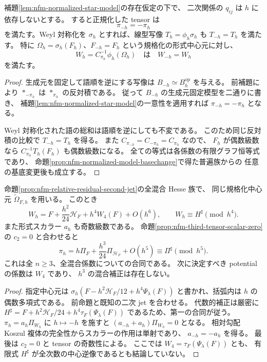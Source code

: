 \begin{proposition}[生成元固定模型の偶奇性]
\label{prop:nfm-normalized-parity}
補題\ref{lem:nfm-normalized-star-model}の存在仮定の下で、
二次関係の $q_{ij}$ は $h$ に依存しないとする。
すると正規化した tensor は
\[
 \pi_{-h}=-\pi_h
\]
を満たす。Weyl 対称化を $\sigma_h$ とすれば、線型写像
$T_h=\phi_h\sigma_h$ も $T_{-h}=T_h$ を満たす。
特に $\Omega_h=\sigma_h(F_h)$、$F_{-h}=F_h$ という規格化の形式中心元に対し、
\[
 W_h=C_{\pi_h}^{-1}\phi_h(\Omega_h)
 \quad\text{は}\quad W_{-h}=W_h
\]
を満たす。
\end{proposition}

\begin{proof}
生成元を固定して語順を逆にする写像は
$B_{-h}\simeq B_h^{\mathrm{op}}$ を与える。
前補題により $*_{-\pi_h}$ は $*_{\pi_h}$ の反対積である。
従って $B_{-h}$ の生成元固定模型を二通りに書き、
補題\ref{lem:nfm-normalized-star-model}の一意性を適用すれば
$\pi_{-h}=-\pi_h$ となる。

Weyl 対称化された語の総和は語順を逆にしても不変である。
このため同じ反対積の比較で $T_{-h}=T_h$ を得る。
また $C_{\pi_{-h}}=C_{-\pi_h}=C_{\pi_h}$ なので、
$F_h$ が偶数級数なら $C_{\pi_h}^{-1}T_h(F_h)$ も偶数級数になる。
全ての等式は各係数の有限グラフ恒等式であり、
命題\ref{prop:nfm-normalized-model-basechange}で得た普遍族からの
任意の基底変更後も成立する。
\end{proof}

\begin{corollary}
\label{cor:nfm-mixed-even-jet}
命題\ref{prop:nfm-relative-residual-second-jet}の全混合 Hesse 族で、
同じ規格化中心元 $\widetilde\Omega_{F,h}$ を用いる。
このとき
\[
 W_h=F+\frac{h^2}{24}\mathscr H_F+h^4W_4(F)+O(h^6),
 \qquad
 W_h\equiv H^\sharp\pmod{h^4}.
\]
また形式スカラー $a_h$ も奇数級数である。
命題\ref{prop:nfm-third-tensor-scalar-zero}の $c_2=0$ と合わせると
\[
 \pi_h=h\Pi_F+\frac{h^3}{24}\Pi_{\mathscr H_F}+O(h^5)
       \equiv\Pi^\sharp\pmod{h^5}.
\]
これは全 $n\ge3$、全混合係数についての合同である。
次に決定すべき potential の係数は $W_4$ であり、
$h^3$ の混合補正は存在しない。
\end{corollary}

\begin{proof}
指定中心元は
$\sigma_h(F-h^2\mathscr H_F/12+h^4\Psi_\lambda(F))$
と書かれ、括弧内は $h$ の偶数多項式である。
前命題と既知の二次 jet を合わせる。
代数的補正は厳密に
$H^\sharp=F+h^2\mathscr H_F/24+h^4\tau_F(\Psi_\lambda(F))$
であるため、第一の合同が従う。
$\pi_h=a_h\Pi_{W_h}$ に $h\mapsto-h$ を施すと
$(a_{-h}+a_h)\Pi_{W_h}=0$ となる。
相対勾配 Koszul 複体の完全性からスカラーの作用は単射であり、
$a_{-h}=-a_h$ を得る。
最後は $c_2=0$ と tensor の奇数性による。
ここでは $W_4=\tau_F(\Psi_\lambda(F))$ とも、
有限式 $H^\sharp$ が全次数の中心逆像であるとも結論していない。
\end{proof}


